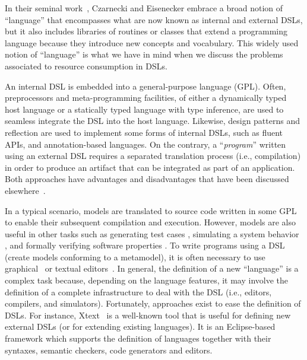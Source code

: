 In their seminal work~\cite{Czarnecki2000}, Czarnecki and Eisenecker embrace a broad notion of ``language'' that encompasses what are now known as internal and external DSLs, but it also includes libraries of routines or classes that extend a programming language because they introduce new concepts and vocabulary.
This widely used notion of ``language'' is what we have in mind when we discuss the problems associated to resource consumption in DSLs.

An internal DSL is embedded into a general-purpose language (GPL).
Often, preprocessors and meta-programming facilities, of either a dynamically typed host language or a statically typed language with type inference, are used to seamless integrate the DSL into the host language.
Likewise, design patterns and reflection are used to implement some forms of internal DSLs, such as fluent APIs, and annotation-based languages.
On the contrary, a ``\textit{program}'' written using an external DSL requires a separated translation process (i.e., compilation) in order to produce an artifact that can be integrated as part of an application.
Both approaches have advantages and disadvantages that have been discussed elsewhere~\cite{Czarnecki2000, Stahl:2006:MSD:1196766}.

In a typical scenario, models are translated to source code written in some GPL to enable their subsequent compilation and execution.
However, models are also useful in other tasks such as generating test cases \cite{Kiffe2009,Gutierrez2015}, simulating a system behavior \cite{Broenink2012,brosig2015a,Bocciarelli2015425}, and formally verifying software properties \cite{Holzmann2004,Henriksson2005101,Moffett2013,DiGuglielmo20132013}. 
To write programs using a DSL (create models conforming to a metamodel), it is often necessary to use graphical~\cite{Kolovos:2009:RLA:1564600.1564699, Biermann:2006:GDI:2087202.2087244} or textual editors~\cite{Merkle:2010:TMT:1869542.1869564}.
In general, the definition of a new ``language'' is a complex task because, depending on the language features, it may involve the definition of a complete infrastructure to deal with the DSL (i.e., editors, compilers, and simulators).
Fortunately, approaches exist to ease the definition of DSLs.
For instance, Xtext~\cite{Eysholdt:2010:XIY:1869542.1869625} is a well-known tool that is useful for defining new external DSLs (or for extending existing languages).
It is an Eclipse-based framework which supports the definition of languages together with their syntaxes, semantic checkers, code generators and editors.

